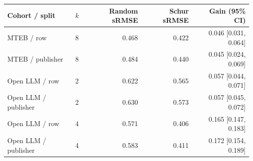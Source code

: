 \begin{tabular}{llrrr}
\toprule Cohort / split & $k$ & Random sRMSE & Schur sRMSE & Gain (95\% CI)\\\midrule
MTEB / row & 8 & 0.468 & 0.422 & 0.046 [0.031, 0.064]\\
MTEB / publisher & 8 & 0.484 & 0.440 & 0.045 [0.024, 0.069]\\
Open LLM / row & 2 & 0.622 & 0.565 & 0.057 [0.044, 0.071]\\
Open LLM / publisher & 2 & 0.630 & 0.573 & 0.057 [0.045, 0.072]\\
Open LLM / row & 4 & 0.571 & 0.406 & 0.165 [0.147, 0.183]\\
Open LLM / publisher & 4 & 0.583 & 0.411 & 0.172 [0.154, 0.189]\\
\bottomrule\end{tabular}